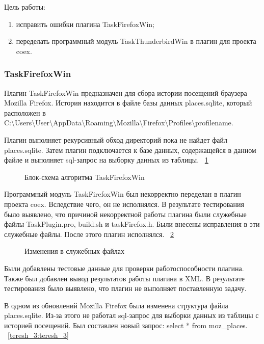 ﻿Цель работы:
\begin{enumerate}
  \item исправить ошибки плагина TaskFirefoxWin;
  \item переделать программный модуль TaskThunderbirdWin в плагин для проекта coex.
\end{enumerate}

\subsubsection{TaskFirefoxWin}

Плагин TaskFirefoxWin предназначен для сбора истории посещений браузера Mozilla Firefox. История находится в файле базы данных places.sqlite, который расположен в C:\textbackslash Users\textbackslash User\textbackslash AppData\textbackslash Roaming\textbackslash Mozilla\textbackslash Firefox\textbackslash Profiles\textbackslash profilename.

Плагин выполняет рекурсивный обход директорий пока не найдет файл places.sqlite. Затем плагин подключается к базе данных, содержащейся в данном файле и выполняет sql-запрос на выборку данных из таблицы.
~\ref{teresh_1:teresh_1}

\begin{figure}[h!]
\caption{ Блок-схема алгоритма TaskFirefoxWin }
\label{teresh_1:teresh_1}
\end{figure}

Программный модуль TaskFirefoxWin был некорректно переделан в плагин проекта coex. Вследствие чего, он не исполнялся. В результате тестирования было выявлено, что причиной некорректной работы плагина были служебные файлы TaskPlugin.pro, build.sh и taskFirefox.h. Были внесены исправления в эти служебные файлы. После этого плагин исполнялся.
~\ref{teresh_2:teresh_2}

\begin{figure}[h!]
\caption{ Изменения в служебных файлах }
\label{teresh_2:teresh_2}
\end{figure}

Были добавлены тестовые данные для проверки работоспособности плагина. Также был добавлен вывод результатов работы плагина в XML. В результате тестирования было выявлено, что плагин не выполняет поставленную задачу.

В одном из обновлений Mozilla Firefox была изменена структура файла places.sqlite. Из-за этого не работал sql-запрос для выборки данных из таблицы с историей посещений. Был составлен новый запрос: select * from moz\_places.
~\ref{teresh_3:teresh_3}

